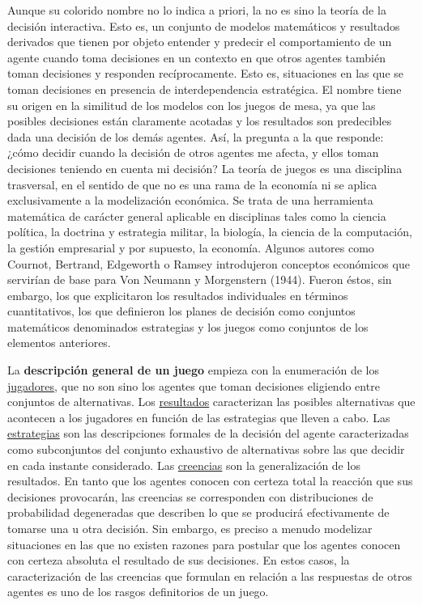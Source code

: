 \documentclass{nuevotema}
\begin{document}
Aunque su colorido nombre no lo indica a priori, la  no es sino la teoría de la decisión interactiva. Esto es, un conjunto de modelos matemáticos y resultados derivados que tienen por objeto entender y predecir el comportamiento de un agente cuando toma decisiones en un contexto en que otros agentes también toman decisiones y responden recíprocamente. Esto es, situaciones en las que se toman decisiones en presencia de interdependencia estratégica. El nombre tiene su origen en la similitud de los modelos con los juegos de mesa, ya que las posibles decisiones están claramente acotadas y los resultados son predecibles dada una decisión de los demás agentes. Así, la pregunta a la que responde: ¿cómo decidir cuando la decisión de otros agentes me afecta, y ellos toman decisiones teniendo en cuenta mi decisión? La teoría de juegos es una disciplina trasversal, en el sentido de que no es una rama de la economía ni se aplica exclusivamente a la modelización económica. Se trata de una herramienta matemática de carácter general aplicable en disciplinas tales como la ciencia política, la doctrina y estrategia militar, la biología, la ciencia de la computación, la gestión empresarial y por supuesto, la economía. Algunos autores  como Cournot, Bertrand, Edgeworth o Ramsey introdujeron conceptos económicos que servirían de base para Von Neumann y Morgenstern (1944). Fueron éstos, sin embargo, los que explicitaron los resultados individuales en términos cuantitativos, los que definieron los planes de decisión como conjuntos matemáticos denominados estrategias y los juegos como conjuntos de los elementos anteriores.

La \textbf{descripción general de un juego} empieza con la enumeración de los \underline{jugadores}, que no son sino los agentes que toman decisiones eligiendo entre conjuntos de alternativas. Los \underline{resultados} caracterizan las posibles alternativas que acontecen a los jugadores en función de las estrategias que lleven a cabo. Las \underline{estrategias} son las descripciones formales de la decisión del agente caracterizadas como subconjuntos del conjunto exhaustivo de alternativas sobre las que decidir en cada instante considerado. Las \underline{creencias} son la generalización de los resultados. En tanto que los agentes conocen con certeza total la reacción que sus decisiones provocarán, las creencias se corresponden con distribuciones de probabilidad degeneradas que describen lo que se producirá efectivamente de tomarse una u otra decisión. Sin embargo, es preciso a menudo modelizar situaciones en las que no existen razones para postular que los agentes conocen con certeza absoluta el resultado de sus decisiones. En estos casos, la caracterización de las creencias que formulan en relación a las respuestas de otros agentes es uno de los rasgos definitorios de un juego. 
\end{document}
